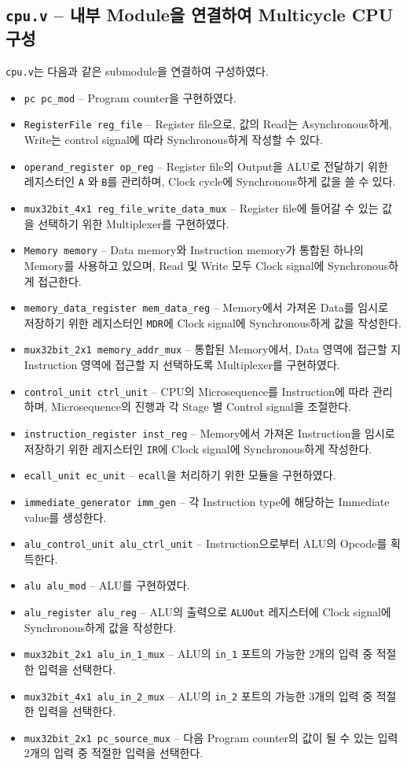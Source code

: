 \documentclass{scrartcl}
\begin{document}
\subsection{\texttt{cpu.v} -- 내부 Module을 연결하여 Multicycle CPU 구성}
\texttt{cpu.v}는 다음과 같은 submodule을 연결하여 구성하였다.
\begin{itemize}
\item \texttt{pc pc\_mod} -- Program counter을 구현하였다.
\item \texttt{RegisterFile reg\_file} -- Register file으로, 값의 Read는 Asynchronous하게,  Write는 control signal에 따라 Synchronous하게 작성할 수 있다.
\item \texttt{operand\_register op\_reg} -- Register file의 Output을 ALU로 전달하기 위한 레지스터인 \texttt{A} 와 \texttt{B}를 관리하며, Clock cycle에 Synchronous하게 값을 쓸 수 있다.
\item \texttt{mux32bit\_4x1 reg\_file\_write\_data\_mux} -- Register file에 들어갈 수 있는 값을 선택하기 위한 Multiplexer를 구현하였다.
\item \texttt{Memory memory} -- Data memory와 Instruction memory가 통합된 하나의 Memory를 사용하고 있으며, Read 및 Write 모두 Clock signal에 Synchronous하게 접근한다.
\item \texttt{memory\_data\_register mem\_data\_reg} -- Memory에서 가져온 Data를 임시로 저장하기 위한 레지스터인 \texttt{MDR}에 Clock signal에 Synchronous하게 값을 작성한다.
\item \texttt{mux32bit\_2x1 memory\_addr\_mux} -- 통합된 Memory에서, Data 영역에 접근할 지 Instruction 영역에 접근할 지 선택하도록 Multiplexer를 구현하였다.
\item \texttt{control\_unit ctrl\_unit} -- CPU의 Microsequence를 Instruction에 따라 관리하며, Microsequence의 진행과 각 Stage 별 Control signal을 조절한다.
\item \texttt{instruction\_register inst\_reg} -- Memory에서 가져온 Instruction을 임시로 저장하기 위한 레지스터인 \texttt{IR}에 Clock signal에 Synchronous하게 작성한다.
\item \texttt{ecall\_unit ec\_unit} -- \texttt{ecall}을 처리하기 위한 모듈을 구현하였다.
\item \texttt{immediate\_generator imm\_gen} -- 각 Instruction type에 해당하는 Immediate value를 생성한다.
\item \texttt{alu\_control\_unit alu\_ctrl\_unit} -- Instruction으로부터 ALU의 Opcode를 획득한다.
\item \texttt{alu alu\_mod} -- ALU를 구현하였다.
\item \texttt{alu\_register alu\_reg} -- ALU의 출력으로 \texttt{ALUOut} 레지스터에 Clock signal에 Synchronous하게 값을 작성한다.
\item \texttt{mux32bit\_2x1 alu\_in\_1\_mux} -- ALU의 \texttt{in\_1} 포트의 가능한 2개의 입력 중 적절한 입력을 선택한다.
\item \texttt{mux32bit\_4x1 alu\_in\_2\_mux} -- ALU의 \texttt{in\_2} 포트의 가능한 3개의 입력 중 적절한 입력을 선택한다.
\item \texttt{mux32bit\_2x1 pc\_source\_mux} -- 다음 Program counter의 값이 될 수 있는 입력 2개의 입력 중 적절한 입력을 선택한다.
\end{itemize}
\end{document}
